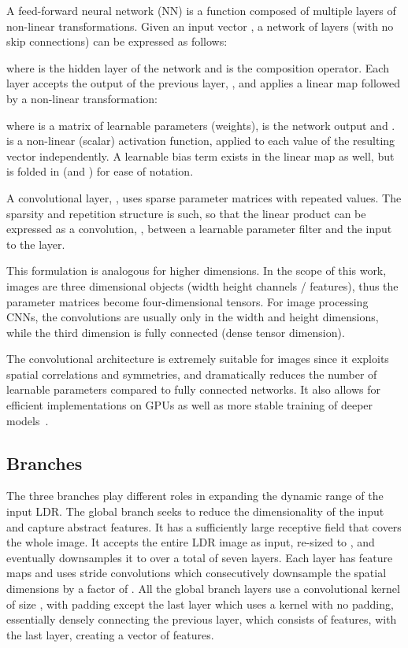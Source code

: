 \documentclass{egpubl}
\begin{document}
A feed-forward neural network (NN) is a function composed of multiple layers of
non-linear transformations. Given an input vector , a network of 
layers (with no skip connections) can be expressed as follows:

where  is the  hidden layer of the network and  is the
composition operator. Each layer accepts the output of the previous layer,
, and applies a linear map followed by a non-linear
transformation:

where  is a matrix of learnable parameters (weights),  is the
network output and .  is a non-linear (scalar)
activation function, applied to each value of the resulting vector
independently. A learnable bias term exists in the linear map as well, but is
folded in  (and ) for ease of notation.

A convolutional layer, , uses sparse parameter matrices with repeated
values. The sparsity and repetition structure is such, so that the linear
product can be expressed as a convolution, , between a learnable parameter filter
 and the input to the layer.


This formulation is analogous for higher dimensions. In the scope of this work,
images are three dimensional objects
(width  height  channels / features), thus the parameter matrices
become four-dimensional tensors. For image processing CNNs, the convolutions
are usually only in the width and height dimensions, while the third dimension
is fully connected (dense tensor dimension).

The convolutional architecture is extremely suitable for images since it exploits spatial correlations and symmetries, and dramatically reduces the
number of learnable parameters compared to fully connected networks. It also allows for efficient implementations on GPUs as well as more stable
training of deeper models~\cite{schmidhuber2014deep}.

\subsection{\textbf{Branches}}

The three branches play different roles in expanding the dynamic range of the
input LDR. The global branch seeks to reduce the dimensionality of the input
and capture abstract features. It has a sufficiently large receptive field that
covers the whole image. It accepts the entire LDR image as input, re-sized to
, and eventually downsamples it to  over a total of
seven layers. Each layer has  feature maps and uses stride  convolutions
which consecutively downsample the spatial dimensions by a factor of . All
the global branch layers use a convolutional kernel of size , with
padding  except the last layer which uses a  kernel with no
padding, essentially densely connecting the previous layer, which consists of
 features, with the last layer, creating a vector of 
features.
\end{document}
